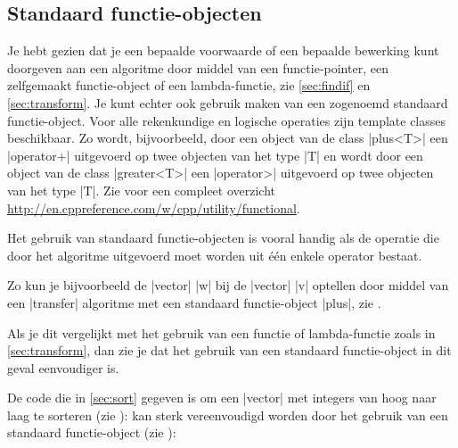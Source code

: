 \begin{cpplstShortInline}
\section{Standaard functie\hyp{}objecten}
\label{sec:stdfunctieobjecten}
Je hebt gezien dat je een bepaalde voorwaarde of een bepaalde bewerking kunt doorgeven aan een algoritme door middel van een functie\hyp{}pointer, een zelfgemaakt functie\hyp{}object of een lambda\hyp{}functie, zie \cref{sec:findif} en \cref{sec:transform}.
Je kunt echter ook gebruik maken van een zogenoemd standaard functie\hyp{}object.
Voor alle rekenkundige en logische operaties zijn template classes beschikbaar.
Zo wordt, bijvoorbeeld, door een object van de class |plus<T>| een |operator+| uitgevoerd op twee objecten van het type |T| en wordt door een object van de class |greater<T>| een |operator>| uitgevoerd op twee objecten van het type |T|.
Zie voor een compleet overzicht \url{http://en.cppreference.com/w/cpp/utility/functional}.

Het gebruik van standaard functie\hyp{}objecten is vooral handig als de operatie die door het algoritme uitgevoerd moet worden uit één enkele operator bestaat.

Zo kun je bijvoorbeeld de |vector| |w| bij de |vector| |v| optellen door middel van een |transfer| algoritme met een standaard functie\hyp{}object |plus|, zie .


Als je dit vergelijkt met het gebruik van een functie of lambda\hyp{}functie zoals in \cref{sec:transform}, dan zie je dat het gebruik van een standaard functie\hyp{}object in dit geval eenvoudiger is.

De code die in \cref{sec:sort} gegeven is om een |vector| met integers van hoog naar laag te sorteren (zie ):
kan sterk vereenvoudigd worden door het gebruik van een standaard functie\hyp{}object (zie ):


\end{cpplstShortInline}

